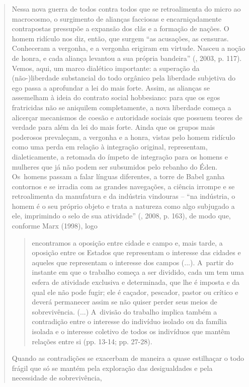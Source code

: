 {\begin{quote}
Nessa nova guerra de todos contra todos que se retroalimenta do micro ao
macrocosmo, o surgimento de alianças facciosas e encarniçadamente
contrapostas pressupõe a expansão dos clãs e a formação de nações. O
homem ridículo nos diz, então, que surgem ``as acusações, as censuras.
Conheceram a vergonha, e a vergonha erigiram em virtude. Nasceu a noção
de honra, e cada aliança levantou a sua própria bandeira'' (,
2003, p. 117). Vemos, aqui, um marco dialético importante: a superação
da (não-)liberdade substancial do todo orgânico pela liberdade subjetiva
do ego passa a aprofundar a lei do mais forte. Assim, as alianças se
assemelham à ideia do contrato social hobbesiano: para que os egos
fratricidas não se aniquilem completamente, a nova liberdade começa a
alicerçar mecanismos de coesão e autoridade sociais que possuem teores
de verdade para além da lei do mais forte. Ainda que os grupos mais
poderosos prevaleçam, a vergonha e a honra, vistas pelo homem ridículo
como uma perda em relação à integração original, representam,
dialeticamente, a retomada do ímpeto de integração para os homens e
mulheres que já não podem ser subsumidos pelo rebanho do Éden. Os~homens
passam a falar línguas diferentes, a torre de Babel ganha contornos e se
irradia com as grandes navegações, a ciência irrompe e se retroalimenta
da manufatura e da indústria vindouras -- ``na indústria, o homem é o
seu próprio objeto e trata a natureza como algo subjugado a ele,
imprimindo o selo de sua atividade'' (, 2008, p. 163), de modo que,
conforme Marx (1998), logo

\begin{quote}
encontramos a oposição entre cidade e campo e, mais tarde, a oposição
entre os Estados que representam o interesse das cidades e aqueles que
representam o interesse dos campos (...). A~partir do instante em que o
trabalho começa a ser dividido, cada um tem uma esfera de atividade
exclusiva e determinada, que lhe é imposta e da qual ele não pode fugir;
ele é caçador, pescador, pastor ou crítico e deverá permanecer assim se
não quiser perder seus meios de sobrevivência. (...) A~divisão do
trabalho implica também a contradição entre o interesse do indivíduo
isolado ou da família isolada e o interesse coletivo de todos os
indivíduos que mantêm relações entre si (pp. 13-14; pp. 27-28).
\end{quote}

Quando as contradições se exacerbam de maneira a quase estilhaçar o todo
frágil que só se mantém pela exploração das desigualdades e pela
necessidade de sobrevivência,


\end{quote}}
